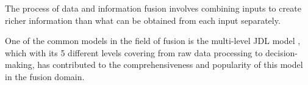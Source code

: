 \documentclass[5p,times]{elsarticle}
\begin{document}
The process of data and information fusion involves combining inputs to create richer information than what can be obtained from
 each input separately. 





One of the common models in the field of fusion is the multi-level JDL model \cite{Hall1997},
 which with its 5 different levels covering from raw data processing to decision-making, has contributed to the comprehensiveness and popularity of this model in the fusion domain.


  
\end{document}
